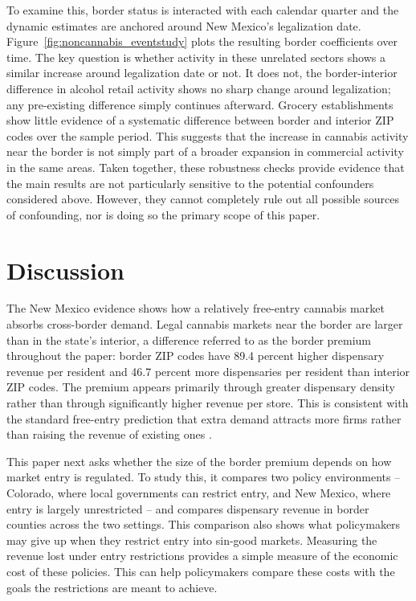 \documentclass[english,12pt]{article}
\begin{document}
To examine this, border status is interacted with each calendar quarter and the dynamic estimates are anchored around New Mexico's legalization date. Figure~\ref{fig:noncannabis_eventstudy} plots the resulting border coefficients over time. The key question is whether activity in these unrelated sectors shows a similar increase around legalization date or not. It does not, the border-interior difference in alcohol retail activity shows no sharp change around legalization; any pre-existing difference simply continues afterward. Grocery establishments show little evidence of a systematic difference between border and interior ZIP codes over the sample period. This suggests that the increase in cannabis activity near the border is not simply part of a broader expansion in commercial activity in the same areas. 
Taken together, these robustness checks provide evidence that the main results are not particularly sensitive to the potential confounders considered above. However, they cannot completely rule out all possible sources of confounding, nor is doing so the primary scope of this paper.



\section{Discussion}
\label{sec:discussion}

The New Mexico evidence shows how a relatively free-entry cannabis market absorbs cross-border demand. Legal cannabis markets near the border are larger than in the state's interior, a difference referred to as the border premium throughout the paper: border ZIP codes have 89.4 percent higher dispensary revenue per resident and 46.7 percent more dispensaries per resident than interior ZIP codes. The premium appears primarily through greater dispensary density rather than through significantly higher revenue per store. This is consistent with the standard free-entry prediction that extra demand attracts more firms rather than raising the revenue of existing ones \citep{BresnahanReiss1991}.

This paper next asks whether the size of the border premium depends on how market entry is regulated. To study this, it compares two policy environments -- Colorado, where local governments can restrict entry, and New Mexico, where entry is largely unrestricted -- and compares dispensary revenue in border counties across the two settings. This comparison also shows what policymakers may give up when they restrict entry into sin-good markets. Measuring the revenue lost under entry restrictions provides a simple measure of the economic cost of these policies. This can help policymakers compare these costs with the goals the restrictions are meant to achieve.
\end{document}
